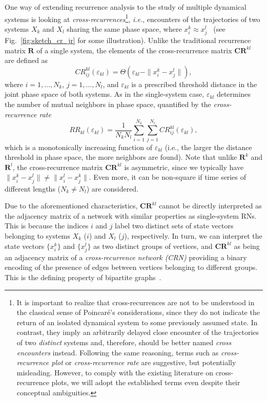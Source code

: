 One way of extending recurrence analysis to the study of multiple dynamical systems is looking at \emph{cross-recurrences}\footnote{It is important to realize that cross-recurrences are not to be understood in the classical sense of Poincar{\'e}'s considerations, since they do not indicate the return of an isolated dynamical system to some previously assumed state. In contrast, they imply an arbitrarily delayed close encounter of the trajectories of two \emph{distinct} systems and, therefore, should be better named \emph{cross encounters} instead. Following the same reasoning, terms such as \emph{cross-recurrence plot} or \emph{cross-recurrence rate} are suggestive, but potentially misleading. However, to comply with the existing literature on cross-recurrence plots, we will adopt the established terms even despite their conceptual ambiguities.}, \textit{i.e.}, encounters of the trajectories of two systems $X_k$ and $X_l$ sharing the same phase space, where $x_i^k \approx x_j^l$~\cite{Marwan2002PLA,Zbilut1998} (see Fig.~\ref{fig:sketch_cr_jr} for some illustration). Unlike the traditional recurrence matrix $\mathbf{R}$ of a single system, the elements of the cross-recurrence matrix $\mathbf{CR}^{kl}$ are defined as
\begin{equation}
CR_{ij}^{kl}(\varepsilon_{kl})=\Theta(\varepsilon_{kl} - \|x_i^k - x_j^l\|),
\end{equation}
where $i=1,\dots,N_k$, $j=1,\dots,N_l$, and $\varepsilon_{kl}$ is a prescribed threshold distance in the joint phase space of both systems. As in the single-system case, $\varepsilon_{kl}$ determines the number of mutual neighbors in phase space, quantified by the \emph{cross-recurrence rate}
\begin{equation}
RR_{kl}(\varepsilon_{kl})=\frac{1}{N_k N_l}\sum_{i=1}^{N_k} \sum_{j=1}^{N_l} CR_{ij}^{kl}(\varepsilon_{kl}),
\label{eq:crr}
\end{equation}
\noindent
which is a monotonically increasing function of $\varepsilon_{kl}$ (i.e., the larger the distance threshold in phase space, the more neighbors are found). Note that unlike $\mathbf{R}^k$ and $\mathbf{R}^l$, the cross-recurrence matrix $\mathbf{CR}^{kl}$ is asymmetric, since we typically have $\|x_i^k - x_j^l\|\neq\|x_i^l - x_j^k\|$. Even more, it can be non-square if time series of different lengths ($N_k\neq N_l$) are considered.
        
Due to the aforementioned characteristics, $\mathbf{CR}^{kl}$ cannot be directly interpreted as the adjacency matrix of a network with similar properties as single-system RNs. This is because the indices $i$ and $j$ label two distinct sets of state vectors belonging to systems $X_k$ ($i$) and $X_l$ ($j$), respectively. In turn, we can interpret the state vectors $\{x^k_i\}$ and $\{x^l_j\}$ as two distinct groups of vertices, and $\mathbf{CR}^{kl}$ as being an adjacency matrix of a \emph{cross-recurrence network (CRN)} providing a binary encoding of the presence of edges between vertices belonging to different groups. This is the defining property of bipartite graphs~\cite{Newman2003}.

